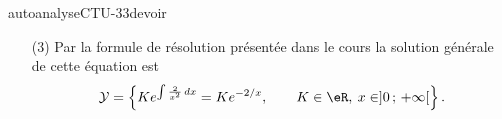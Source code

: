 
\begin{corrige}{autoanalyseCTU-33devoir}


\begin{enumerate}
\item[(3)] Par la formule de résolution présentée dans le cours la solution générale de cette équation est 
\[
\mathcal{Y} =\left\{ K e^{\int \frac{2}{x^2}\,dx} = K e^{-2/x}, \qquad K \in \eR, \:x\in ]0\,;\,+\infty[ \right\}.
\]
\end{enumerate}


\end{corrige}   
